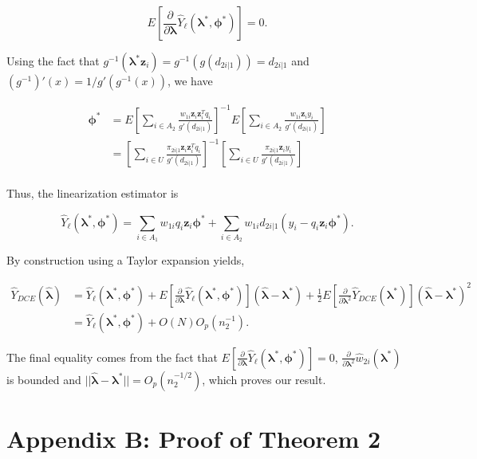 \documentclass[12pt]{article}
\renewcommand{\bf}[1]{\mathbf{#1}}
\begin{document}
$$
E\left[\frac{\partial}{\partial \bm \lambda} \hat Y_\ell(\bm \lambda^*,
\bm \phi^*)\right]=0.
$$

Using the fact that $g^{-1}(\bm \lambda^* \bf z_i) = g^{-1}(g(d_{2i|1})) = d_{2i|1}$
and $(g^{-1})'(x) = 1 / g'(g^{-1}(x))$, we have

\begin{align*}
  \bm \phi^*
  &= E\left[\sum_{i \in A_2} \frac{w_{1i}\bf z_i \bf z_i^T q_i}{g'(d_{2i|1})}
  \right]^{-1}
  E\left[\sum_{i \in A_2} \frac{w_{1i}\bf z_i y_i}{g'(d_{2i|1})}\right]\\
  &= \left[\sum_{i \in U} \frac{\pi_{2i|1} \bf z_i \bf z_i^T q_i}{g'(d_{2i|1})}
  \right]^{-1}
  \left[\sum_{i \in U} \frac{\pi_{2i|1} \bf z_i y_i}{g'(d_{2i|1})}\right]\\
\end{align*}

Thus, the linearization estimator is

$$\hat Y_\ell(\bm \lambda^*, \bm \phi^*) = 
\sum_{i \in A_1} w_{1i} q_i \bf z_i \bm \phi^* +
\sum_{i \in A_2} w_{1i} d_{2i|1} (y_i - q_i \bf z_i \bm \phi^*).$$

By construction using a Taylor expansion yields,

\begin{align*}
  \hat Y_{DCE}(\hat{\bm \lambda}) 
  &= \hat Y_\ell(\bm \lambda^*, \bm \phi^*) + 
  E\left[\frac{\partial}{\partial \bm \lambda}\hat Y_\ell(\bm \lambda^*,
  \bm \phi^*)\right](\hat{\bm \lambda} - \bm \lambda^*) + \frac{1}{2}
  E\left[\frac{\partial}{\partial \bm \lambda^2} \hat Y_{DCE}(\bm \lambda^*)\right] 
  (\hat{\bm \lambda} - \bm \lambda^*)^2\\
  &= \hat Y_\ell(\bm \lambda^*, \bm \phi^*) + O(N)O_p(n_2^{-1}).
\end{align*}

The final equality comes from the fact that 
$E\left[\frac{\partial}{\partial \bm \lambda}
\hat Y_\ell(\bm \lambda^*, \bm \phi^*)\right] = 0$,
$\frac{\partial}{\partial \bm \lambda^2} \hat w_{2i}(\bm \lambda^*)$ is
bounded and $||\hat{\bm \lambda} - \bm \lambda^*|| = O_p(n_2^{-1/2})$, which
proves our result.

\section*{Appendix B: Proof of Theorem 2}
\end{document}
